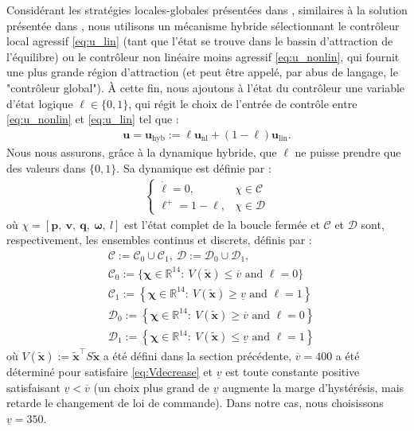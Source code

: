 Considérant les stratégies locales-globales présentées dans \cite[Ex. 1. 7]{65}, similaires à la solution présentée dans \cite{AndreettoFZ16}, nous utilisons un mécanisme hybride sélectionnant le contrôleur local agressif \eqref{eq:u_lin} (tant que l'état se trouve dans le bassin d'attraction de l'équilibre) ou le contrôleur non linéaire moins agressif \eqref{eq:u_nonlin}, qui fournit une plus grande région d'attraction (et peut être appelé, par abus de langage, le "contrôleur global"). À cette fin, nous ajoutons à l'état du contrôleur une variable d'état logique $\ell \in \{0,1\}$, qui régit le choix de l'entrée de contrôle entre \eqref{eq:u_nonlin} et \eqref{eq:u_lin} tel que :
\begin{align}
\label{eq:u_hybrid}
  \boldsymbol{u}=\boldsymbol{u}_{\text{hyb}} := \ell \boldsymbol{u}_{\text{nl}} + (1-\ell) \boldsymbol{u}_{\text{lin}}.
\end{align}
Nous nous assurons, grâce à la dynamique hybride, que $\ell$ ne puisse prendre que des valeurs dans $\{0,1\}$. Sa dynamique est définie par : 
\begin{align*}
    \left\{
        \begin{array}{ll}
            \dot \ell = 0,& \chi \in \mathcal{C}\\
            \ell^{+} = 1-\ell,& \chi \in \mathcal{D}
        \end{array}
    \right.
\end{align*}
où $\chi = \left[\boldsymbol{p},~ \boldsymbol{v},~ \boldsymbol{q},~  \boldsymbol{\omega},~ l\right]$ est l'état complet de la boucle fermée et $\mathcal{C}$ et $\mathcal{D}$ sont, respectivement, les ensembles continus et discrets, définis par :
\begin{align*}
    & \mathcal{C} := \mathcal{C}_{0} \cup \mathcal{C}_{1}, ~ \mathcal{D} := \mathcal{D}_{0} \cup \mathcal{D}_{1},\\
   & \mathcal{C}_{0} :=\{\boldsymbol{\chi} \in \mathbb{R}^{14}:~ V(\boldsymbol{\tilde x}) \le \overline{v} \mbox{ and } \ell=0\}\\
   & \mathcal{C}_{1} :=\left\{\boldsymbol{\chi} \in \mathbb{R}^{14}:~ V(\boldsymbol{\tilde x}) \ge \underline{v} \mbox{ and } \ell=1 \right\}\\
   & \mathcal{D}_{0} :=\left\{\boldsymbol{\chi} \in \mathbb{R}^{14}:~ V(\boldsymbol{\tilde x}) \geq \overline{v}\mbox{ and } \ell=0 \right\}\\
   & \mathcal{D}_{1} :=\left\{\boldsymbol{\chi} \in \mathbb{R}^{14}:~ V(\boldsymbol{\tilde x}) \leq \underline{v}\mbox{ and } \ell=1 \right\}
\end{align*}
où $V(\boldsymbol{\tilde x}) := \boldsymbol{\tilde x}^\top S \boldsymbol{\tilde x}$  a été défini dans la section précédente, $\overline{v}=400$ a été déterminé pour satisfaire \eqref{eq:Vdecrease} et $\underline{v}$ est toute constante positive satisfaisant $\underline{v}<\overline{v}$ (un choix plus grand de $\underline{v}$ augmente la marge d'hystérésis, mais retarde le changement de loi de commande). Dans notre cas, nous choisissons $\underline{v}= 350$.

